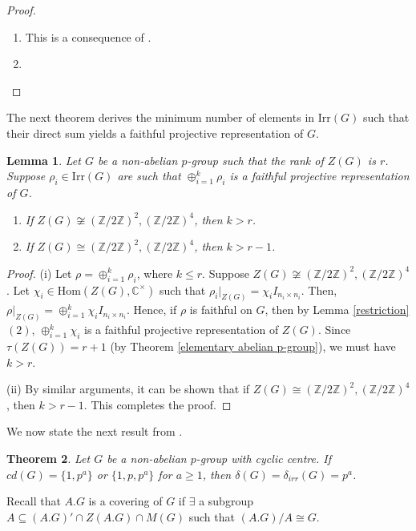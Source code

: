 \documentclass[a4paper,11pt]{amsart}
\numberwithin{equation}{section}
\numberwithin{equation}{subsection}
\newtheorem{theorem}{Theorem}[section]
\newtheorem{lemma}[theorem]{Lemma}
\newcommand{\C}{\mathbb{C}}
\newcommand{\Z}{\mathbb{Z}}
\newcommand{\Hom}{\mathrm{Hom}}
\newcommand{\poonam}[1]{{\color{blue} #1}}
\begin{document}
\begin{proof}
\begin{enumerate}
	\item This is a consequence of \cite[Theorem 3.1]{karpilovsky2}.
	\item 
\end{enumerate}    
\end{proof}
\fi
The next theorem derives the minimum number of elements in $\mathrm{Irr}(G)$ such that their direct sum yields a faithful projective representation of $G$. 
\begin{lemma} \label{direct sum of k irreducible ordinary representations}
Let $G$ be a non-abelian $p$-group such that the rank of $Z(G)$ is $r$. Suppose $\rho_i \in \mathrm{Irr}(G)$ are such that $\oplus_{i=1}^k \rho_i$ is a faithful projective representation of $G$. 
\begin{enumerate}
	\item[(i)] If $Z(G) \not \cong (\Z/2\Z)^2, (\Z/2\Z)^4$, then $k >r$.
	\item[(ii)] If $Z(G) \cong (\Z/2\Z)^2, (\Z/2\Z)^4$, then $k >r-1$.
\end{enumerate}

\end{lemma}

\begin{proof}
(i) Let $\rho = \oplus_{i=1}^k\rho_i$, where $k \leq r$. Suppose $Z(G) \not \cong (\Z/2\Z)^2, (\Z/2\Z)^4$. Let $\chi_i \in \Hom(Z(G), \mathbb C^\times)$ such that $\rho_i|_{Z(G)}= \chi_i I_{n_i\times n_i}$. Then, $\rho|_{Z(G)}= \oplus_{i=1}^k\chi_i I_{n_i\times n_i}$.
Hence, if $\rho$ is faithful on $G$, then by Lemma \ref{restriction}$(2)$, $\oplus_{i=1}^k\chi_i$ is a faithful projective representation of $Z(G)$. Since $\tau(Z(G)) = r+1$ (by Theorem \ref{elementary abelian p-group}), we must have $k > r$. 

(ii) By similar arguments, it can be shown that if $Z(G) \cong (\Z/2\Z)^2, (\Z/2\Z)^4$, then $k >r-1$. This completes the proof. 

\end{proof}
We now state the next result from \cite[Theorem 3.1, Theorem 3.3]{kaur}.
\begin{theorem} \label{embedding degree of a p group with cyclic centre}
Let $G$ be a non-abelian $p$-group with cyclic centre. If $cd(G) =\{1,p^a\}$ or $\{1,p,p^a\}$ for $a \geq 1$, then $\delta(G)= \delta_{irr}(G)= p^a$. 
\end{theorem}
Recall that $A.G$ is a covering of $G$ if $\exists$ a subgroup $A \subseteq {(A.G)}' \cap Z(A.G) \cap M(G)$ such that $(A.G)/A \cong G$. %
\end{document}
